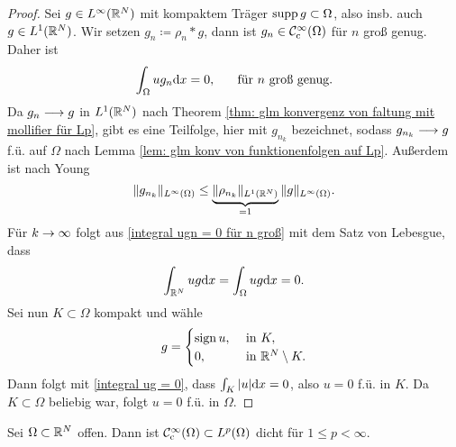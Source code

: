 \begin{proof}
	Sei \(g\in L^\infty(\mathbb{R}^N)\) mit kompaktem Träger \(\operatorname{supp} g\subset\Omega\), also insb. auch \(g\in L^1(\mathbb{R}^N)\). Wir setzen \(g_n\coloneqq\rho_n\ast g\), dann ist \(g_n\in\mathcal{C}_{\mathrm{c}}^\infty(\Omega)\) für \(n\) groß genug. Daher ist
	\begin{equation}
		\label{integral ugn = 0 für n groß}
		\int_\Omega ug_n\mathrm{d}x=0,\;\;\;\;\;\text{ für }n\text{ groß genug.}
	\end{equation}
	Da \(g_n\longrightarrow g\) in \(L^1(\mathbb{R}^N)\) nach Theorem \ref{thm: glm konvergenz von faltung mit mollifier für Lp}, gibt es eine Teilfolge, hier mit \(g_{n_k}\) bezeichnet, sodass \(g_{n_k}\longrightarrow g\) f.ü. auf \(\Omega\) nach Lemma \ref{lem: glm konv von funktionenfolgen auf Lp}. Außerdem ist nach Young
	\begin{equation*}
		\|g_{n_k}\|_{L^\infty(\Omega)}\leq\underbrace{\|\rho_{n_k}\|_{L^1(\mathbb{R}^N)}}_{=1}\|g\|_{L^\infty(\Omega)}.
	\end{equation*}
	Für \(k\rightarrow\infty\) folgt aus \eqref{integral ugn = 0 für n groß} mit dem Satz von Lebesgue, dass
	\begin{equation}
		\label{integral ug = 0}
		\int_{\mathbb{R}^N} ug\mathrm{d}x=\int_\Omega ug\mathrm{d}x=0.
	\end{equation}
	Sei nun \(K\subset\Omega\) kompakt und wähle
	\begin{equation*}
		g=
		\begin{cases}
			\operatorname{sign} u,&\text{ in }K,\\
			0,&\text{ in }\mathbb{R}^N\setminus K.
		\end{cases}
	\end{equation*}
	Dann folgt mit \eqref{integral ug = 0}, dass \(\int_K|u|\mathrm{d}x=0\), also \(u=0\) f.ü. in \(K\). Da \(K\subset\Omega\) beliebig war, folgt \(u=0\) f.ü. in \(\Omega\).
\end{proof}
\begin{cor}\label{kor: Ccinfty dicht in Lp}
	Sei \(\Omega\subset\mathbb{R}^N\) offen. Dann ist \(\mathcal{C}_{\mathrm{c}}^\infty(\Omega)\subset L^p(\Omega)\) dicht für \(1\leq p<\infty\).
\end{cor}
